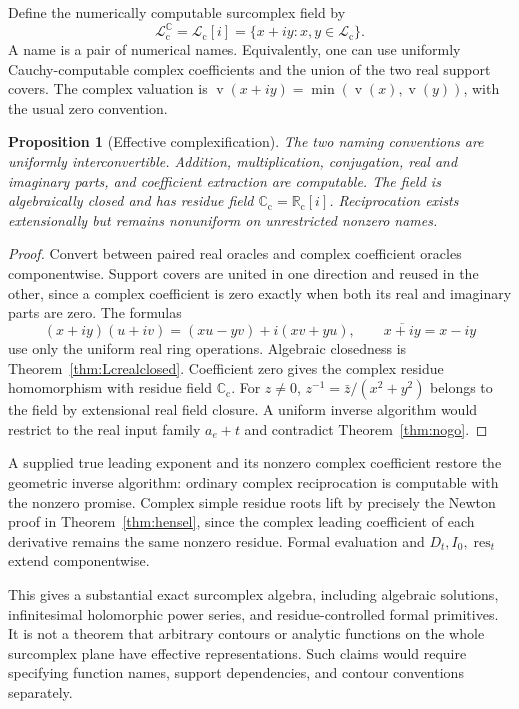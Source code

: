 \documentclass[11pt,letterpaper]{article}
\numberwithin{equation}{section}
\newtheorem{proposition}[theorem]{Proposition}
\theoremstyle{definition}
\theoremstyle{remark}
\newcommand{\Rc}{\mathbb R_{\mathrm c}}
\newcommand{\Cc}{\mathbb C_{\mathrm c}}
\newcommand{\Lc}{\mathcal L_{\mathrm c}}
\newcommand{\res}{\operatorname{res}}
\newcommand{\val}{\operatorname{v}}
\begin{document}
Define the numerically computable surcomplex field by
\[
 \Lc^{\mathbb C}=\Lc[i]=\{x+iy:x,y\in\Lc\}.
\]
A name is a pair of numerical names. Equivalently, one can use uniformly
Cauchy-computable complex coefficients and the union of the two real support
covers. The complex valuation is $\val(x+iy)=\min(\val(x),\val(y))$,
with the usual zero convention.

\begin{proposition}[Effective complexification]
\label{prop:complexification}
The two naming conventions are uniformly interconvertible. Addition,
multiplication, conjugation, real and imaginary parts, and coefficient
extraction are computable. The field is algebraically closed and has
residue field $\Cc=\Rc[i]$. Reciprocation exists extensionally but remains
nonuniform on unrestricted nonzero names.
\end{proposition}
\begin{proof}
Convert between paired real oracles and complex coefficient oracles
componentwise. Support covers are united in one direction and reused in
the other, since a complex coefficient is zero exactly when both its real
and imaginary parts are zero. The formulas
\[
 (x+iy)(u+iv)=(xu-yv)+i(xv+yu),\qquad
 \overline{x+iy}=x-iy
\]
use only the uniform real ring operations. Algebraic closedness is
Theorem~\ref{thm:Lcrealclosed}. Coefficient zero gives the complex residue
homomorphism with residue field $\Cc$.
For $z\ne0$, $z^{-1}=\bar z/(x^2+y^2)$ belongs to the field by
extensional real field closure. A uniform inverse algorithm would
restrict to the real input family $a_e+t$ and contradict
Theorem~\ref{thm:nogo}.
\end{proof}

A supplied true leading exponent and its nonzero complex coefficient
restore the geometric inverse algorithm: ordinary complex reciprocation
is computable with the nonzero promise. Complex simple residue roots lift
by precisely the Newton proof in Theorem~\ref{thm:hensel}, since the
complex leading coefficient of each derivative remains the same nonzero
residue. Formal evaluation and $D_t,I_0,\res_t$ extend componentwise.

This gives a substantial exact surcomplex algebra, including algebraic
solutions, infinitesimal holomorphic power series, and residue-controlled
formal primitives. It is not a theorem that arbitrary contours or
analytic functions on the whole surcomplex plane have effective
representations. Such claims would require specifying function names,
support dependencies, and contour conventions separately.
\end{document}
